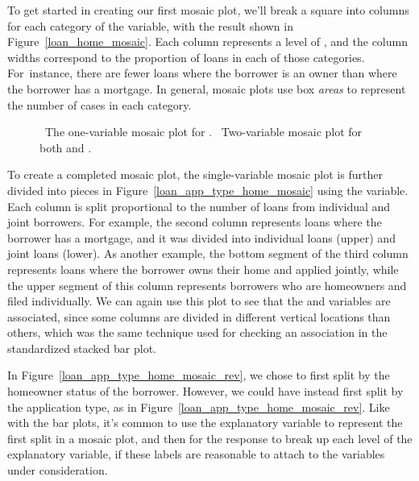 To get started in creating our first mosaic plot,
we'll break a square into columns for each category
of the  variable,
with the result shown in Figure~\ref{loan_home_mosaic}.
Each column represents a level of ,
and the column widths correspond to the proportion of
loans in each of those categories.
For~instance, there are fewer loans where the borrower
is an owner than where the borrower has a mortgage.
In general, mosaic plots use box \emph{areas}
to represent the number of cases in each category.

\begin{figure}[h]
  \centering
  \caption{~The one-variable mosaic
      plot for .
      ~Two-variable mosaic
      plot for both 
      and .}
  \label{loan_app_type_home_mosaic_plot}
\end{figure}

To create a completed mosaic plot, the single-variable
mosaic plot is further divided into pieces in
Figure~\ref{loan_app_type_home_mosaic} using the
 variable.
Each column is split proportional to the
number of loans from individual and joint
borrowers.
For example, the second column represents loans
where the borrower has a mortgage,
and it was divided into individual loans (upper)
and joint loans (lower).
As another example, the bottom segment of the third column
represents loans where the borrower owns their home
and applied jointly, while the upper segment
of this column represents
borrowers who are homeowners and filed individually.
We can again use this plot to see that
the  and 
variables are associated, since some columns are divided
in different vertical locations than others,
which was the same technique used for checking an
association in the standardized stacked bar plot.

In Figure~\ref{loan_app_type_home_mosaic_rev},
we chose to first split by the homeowner status
of the borrower.
However, we could have instead first split by
the application type, as in
Figure~\ref{loan_app_type_home_mosaic_rev}.
Like with the bar plots, it's common to use
the explanatory variable to represent the
first split in a mosaic plot,
and then for the response to break
up each level of the explanatory variable,
if these labels are reasonable to attach to
the variables under consideration.

